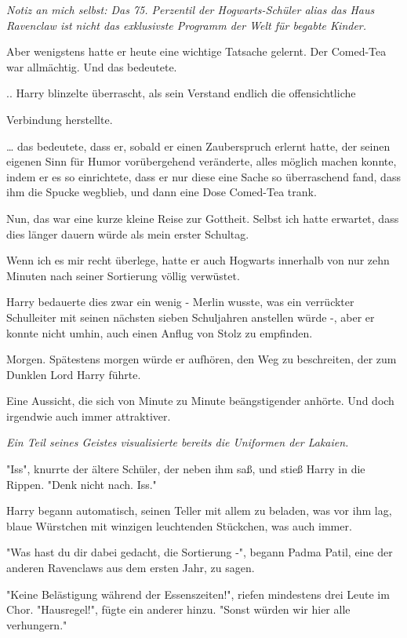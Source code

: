 {\emph{Notiz an mich selbst: Das 75. Perzentil der Hogwarts-Schüler alias das Haus Ravenclaw ist nicht das exklusivste Programm der Welt für begabte Kinder.}

Aber wenigstens hatte er heute eine wichtige Tatsache gelernt. Der Comed-Tea war allmächtig. Und das bedeutete.

.. Harry blinzelte überrascht, als sein Verstand endlich die offensichtliche

Verbindung herstellte.

… das bedeutete, dass er, sobald er einen Zauberspruch erlernt hatte, der seinen eigenen Sinn für Humor vorübergehend veränderte, alles möglich machen konnte, indem er es so einrichtete, dass er nur diese eine Sache so überraschend fand, dass ihm die Spucke wegblieb, und dann eine Dose Comed-Tea trank.

Nun, das war eine kurze kleine Reise zur Gottheit. Selbst ich hatte erwartet, dass dies länger dauern würde als mein erster Schultag.

Wenn ich es mir recht überlege, hatte er auch Hogwarts innerhalb von nur zehn Minuten nach seiner Sortierung völlig verwüstet.

Harry bedauerte dies zwar ein wenig - Merlin wusste, was ein verrückter Schulleiter mit seinen nächsten sieben Schuljahren anstellen würde -, aber er konnte nicht umhin, auch einen Anflug von Stolz zu empfinden.

Morgen. Spätestens morgen würde er aufhören, den Weg zu beschreiten, der zum Dunklen Lord Harry führte.

Eine Aussicht, die sich von Minute zu Minute beängstigender anhörte. Und doch irgendwie auch immer attraktiver.

\emph{Ein Teil seines Geistes visualisierte bereits die Uniformen der Lakaien.}

"Iss", knurrte der ältere Schüler, der neben ihm saß, und stieß Harry in die Rippen. "Denk nicht nach. Iss."

Harry begann automatisch, seinen Teller mit allem zu beladen, was vor ihm lag, blaue Würstchen mit winzigen leuchtenden Stückchen, was auch immer.

"Was hast du dir dabei gedacht, die Sortierung -", begann Padma Patil, eine der anderen Ravenclaws aus dem ersten Jahr, zu sagen.

"Keine Belästigung während der Essenszeiten!", riefen mindestens drei Leute im Chor. "Hausregel!", fügte ein anderer hinzu. "Sonst würden wir hier alle verhungern."

}
